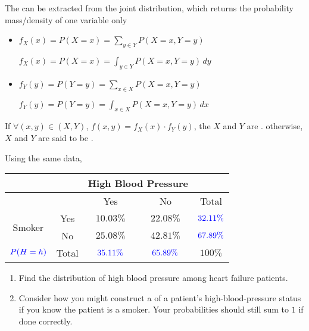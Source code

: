 \begin{definition}
    The  can be extracted from the joint distribution, which returns the probability mass/density of one variable only

    \begin{itemize}
        \item $f_X(x) = P(X = x) = \sum_{y \in Y} P(X = x, Y = y)$

              $f_X(x) = P(X = x) = \int_{y \in Y} P(X = x, Y = y) \,dy$

        \item $f_Y(y) = P(Y = y) = \sum_{x \in X} P(X = x, Y = y)$

              $f_Y(y) = P(Y = y) = \int_{x \in X} P(X = x, Y = y) \,dx$
    \end{itemize}

    If $\forall (x, y) \in (X, Y)$, $f(x, y) = f_X(x) \cdot f_Y(y)$, the $X$ and $Y$ are . otherwise, $X$ and $Y$ are said to be . 
\end{definition}

\begin{example}
    Using the same data, \begin{center}
        \begin{tabular}{c | c | c | c | c}
                                    &       & \multicolumn{2}{c|}{High Blood Pressure}      &                       \\
            \hline
                                    &       & Yes                   & No                    & Total                 \\
            \hline \hline                                             
            \multirow{2}{*}{Smoker} & Yes   & $10.03\%$             & $22.08\%$             & $\color{blue}32.11\%$ \\
                                    & No    & $25.08\%$             & $42.81\%$             & $\color{blue}67.89\%$ \\
            \hline \hline                                 
            $\color{blue}P(H = h)$  & Total & $\color{blue}35.11\%$ & $\color{blue}65.89\%$ & $100\%$               \\
        \end{tabular}
    \end{center}

    \begin{enumerate}[label=\alph*)]
        \item Find the distribution of high blood pressure among heart failure patients. 
        \item Consider how you might construct a  of a patient's high-blood-pressure status if you know the patient is a smoker. Your probabilities should still sum to $1$ if done correctly. 

    \end{enumerate}
\end{example}

